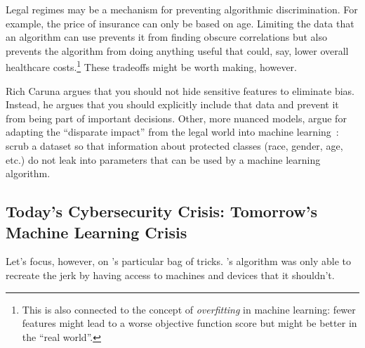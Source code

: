 
Legal regimes may be a mechanism for preventing algorithmic
discrimination.  For example, the price of insurance can only be based
on age.  Limiting the data that an algorithm can use prevents it from
finding obscure correlations but also prevents the algorithm from
doing anything useful that could, say, lower overall healthcare
costs.\footnote{This is also connected to the concept of
  \emph{overfitting} in machine learning: fewer features might lead to
  a worse objective function score but might be better in the ``real
  world''.}  These tradeoffs might be worth making, however.

Rich Caruna argues that you should not hide sensitive features to
eliminate bias.  Instead, he argues that you should explicitly include
that data and prevent it from being part of important decisions.
Other, more nuanced models, argue for adapting the ``disparate
impact'' from the legal world into machine learning~\citep{feldman-15}:
scrub a dataset so that information about protected classes (race,
gender, age, etc.) do not leak into parameters that can be used by a
machine learning algorithm.

\subsection{Today's Cybersecurity Crisis: Tomorrow's Machine Learning Crisis}

Let's focus, however, on \energyJerk{}'s particular bag of tricks.
\energyCompany{}'s algorithm was only able to recreate the jerk by
having access to machines and devices that it shouldn't.

